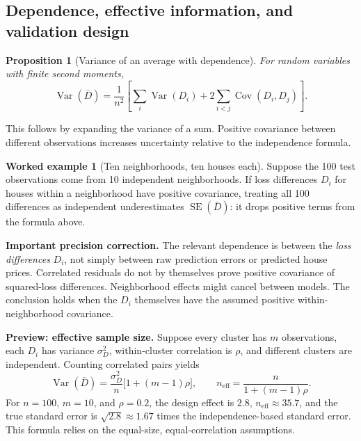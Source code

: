 \documentclass[11pt,letterpaper]{article}
\newcommand{\Var}{\operatorname{Var}}
\newcommand{\Cov}{\operatorname{Cov}}
\newcommand{\SE}{\operatorname{SE}}
\newtheorem{proposition}[theorem]{Proposition}
\theoremstyle{definition}
\newtheorem{example}[theorem]{Worked example}
\theoremstyle{remark}
\numberwithin{equation}{section}
\begin{document}
\subsection{Dependence, effective information, and validation design}
\begin{proposition}[Variance of an average with dependence]
For random variables with finite second moments,
\begin{equation}
\Var(\bar D)=\frac1{n^2}\left[
\sum_i\Var(D_i)+2\sum_{i<j}\Cov(D_i,D_j)\right].
\end{equation}
\end{proposition}
This follows by expanding the variance of a sum. Positive covariance between
different observations increases uncertainty relative to the independence formula.

\begin{example}[Ten neighborhoods, ten houses each]
Suppose the 100 test observations come from 10 independent neighborhoods.
If loss differences $D_i$ for houses within a neighborhood have positive
covariance, treating all 100 differences as independent underestimates
$\SE(\bar D)$: it drops positive terms from the formula above.
\end{example}
\textbf{Important precision correction.} The relevant dependence is between
the \emph{loss differences} $D_i$, not simply between raw prediction errors or
predicted house prices. Correlated residuals do not by themselves prove positive
covariance of squared-loss differences. Neighborhood effects might cancel
between models. The conclusion holds when the $D_i$ themselves have the assumed
positive within-neighborhood covariance.

\textbf{Preview: effective sample size.} Suppose every cluster has $m$ observations,
each $D_i$ has variance $\sigma_D^2$, within-cluster correlation is $\rho$, and
different clusters are independent. Counting correlated pairs yields
\[
\Var(\bar D)=\frac{\sigma_D^2}{n}\bigl[1+(m-1)\rho\bigr],
\qquad n_{\mathrm{eff}}=\frac{n}{1+(m-1)\rho}.
\]
For $n=100$, $m=10$, and $\rho=0.2$, the design effect is $2.8$,
$n_{\mathrm{eff}}\approx35.7$, and the true standard error is
$\sqrt{2.8}\approx1.67$ times the independence-based standard error.
This formula relies on the equal-size, equal-correlation assumptions.
\end{document}
